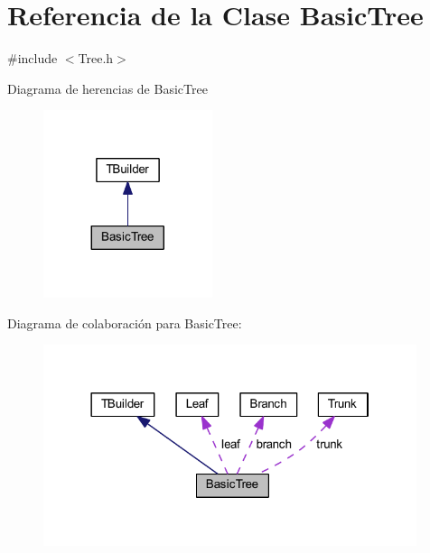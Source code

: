 \hypertarget{class_basic_tree}{}\section{Referencia de la Clase Basic\+Tree}
\label{class_basic_tree}


{\ttfamily \#include $<$Tree.\+h$>$}



Diagrama de herencias de Basic\+Tree
\nopagebreak
\begin{figure}[H]
\begin{center}
\leavevmode
\includegraphics[width=140pt]{class_basic_tree__inherit__graph}
\end{center}
\end{figure}


Diagrama de colaboración para Basic\+Tree\+:
\nopagebreak
\begin{figure}[H]
\begin{center}
\leavevmode
\includegraphics[width=310pt]{class_basic_tree__coll__graph}
\end{center}
\end{figure}
